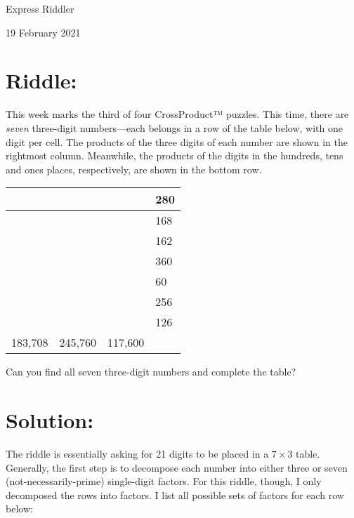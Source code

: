 \documentclass{article}
\begin{document}
\pagestyle{empty} %

\begin{center}
{\LARGE Express Riddler}

\vspace{0.15in}

{\Large 19 February 2021}
\end{center}


\section*{Riddle:}

This week marks the third of four CrossProduct™ puzzles.
This time, there are \textit{seven} three-digit numbers---each belongs in a row of the table below, with one digit per cell.
The products of the three digits of each number are shown in the rightmost column.
Meanwhile, the products of the digits in the hundreds, tens and ones places, respectively, are shown in the bottom row.

\begin{center}
\begin{tabular}{|C{0.75in}|C{0.75in}|C{0.75in}!{\vrule width 1.5pt}R{0.75in}|}
\hline
 & & & 280 \\
\hline
 & & & 168 \\
\hline
 & & & 162 \\
\hline
 & & & 360 \\
\hline
 & & & 60 \\
\hline
 & & & 256 \\
\hline
 & & & 126 \\
183,708 & 245,760 & 117,600 & \\
\hline
\end{tabular}
\end{center}

Can you find all seven three-digit numbers and complete the table?

\section*{Solution:}

The riddle is essentially asking for 21 digits to be placed in a $7\times3$ table.
Generally, the first step is to decompose each number into either three or seven (not-necessarily-prime) single-digit factors.
For this riddle, though, I only decomposed the rows into factors.
I list all possible sets of factors for each row below:
\end{document}
